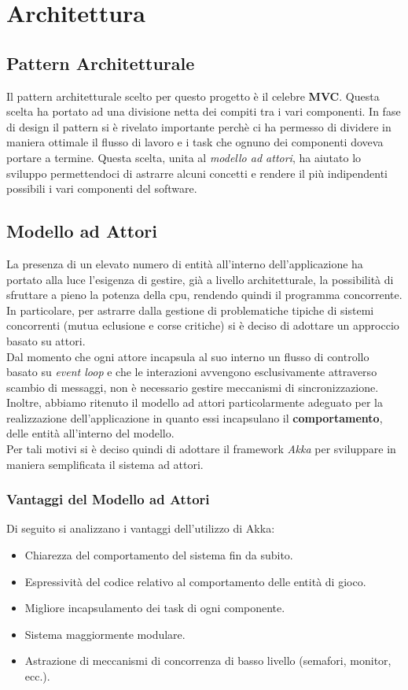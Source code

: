\newpage
\section{Architettura}

\subsection{Pattern Architetturale}
Il pattern architetturale scelto per questo progetto è il celebre \textbf{MVC}.
Questa scelta ha portato ad una divisione netta dei compiti tra i vari componenti. In fase di design il pattern si
è rivelato importante perchè ci ha permesso di dividere in maniera ottimale il flusso di lavoro e i task che ognuno dei
componenti doveva portare a termine. Questa scelta, unita al \textit{modello ad attori}, ha aiutato
lo sviluppo permettendoci di astrarre alcuni concetti e rendere il più indipendenti possibili i vari componenti del software.

\subsection{Modello ad Attori}
La presenza di un elevato numero di entità all’interno dell’applicazione ha portato alla luce
l’esigenza di gestire, già a livello architetturale, la possibilità di sfruttare a pieno la potenza
della cpu, rendendo quindi il programma concorrente. \\
In particolare, per astrarre dalla gestione
di problematiche tipiche di sistemi concorrenti (mutua eclusione e corse critiche) si è deciso di
adottare un approccio basato su attori.\\
Dal momento che ogni attore incapsula al suo interno
un flusso di controllo basato su \textit{event loop} e che le interazioni avvengono esclusivamente
attraverso scambio di messaggi, non è necessario gestire meccanismi di sincronizzazione. \\
Inoltre, abbiamo ritenuto il modello ad attori particolarmente adeguato per la realizzazione
dell’applicazione in quanto essi incapsulano il \textbf{comportamento}, delle entità all’interno del modello. \\
Per tali motivi si è deciso quindi di adottare il framework
\textit{Akka} per sviluppare in maniera semplificata il sistema ad attori.

\subsubsection{Vantaggi del Modello ad Attori}
Di seguito si analizzano i vantaggi dell'utilizzo di Akka:
\begin{itemize}
    \item Chiarezza del comportamento del sistema fin da subito.
    \item Espressività del codice relativo al comportamento delle entità di gioco.
    \item Migliore incapsulamento dei task di ogni componente.
    \item Sistema maggiormente modulare.
    \item Astrazione di meccanismi di concorrenza di basso livello (semafori, monitor, ecc.).
\end{itemize}

